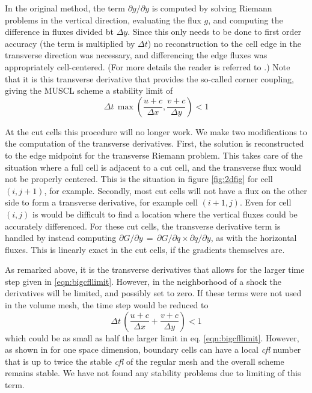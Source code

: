 In the original method, the term $\partial g / \partial y$ is computed by solving Riemann
problems in the vertical direction,  evaluating the flux $g$, and computing the
difference in fluxes divided bt $\Delta y$.
Since this only needs to be done to first order accuracy (the term is multiplied
by $\Delta t$)  no reconstruction to the cell edge  in the transverse 
direction was necessary,
and differencing the edge fluxes was appropriately cell-centered.
(For more details the reader is referred to \cite{Colella:Unsplit}.)
Note that it is this transverse derivative that provides the so-called corner coupling,
giving the MUSCL scheme a stability limit of
\begin{equation}
\label{eqn:bigcfllimit}
\Delta t \, \max \left (\frac{u+c}{\Delta x} , \frac{v+c}{\Delta y} \right) < 1
\end{equation}

At the cut cells this procedure will no longer work.   We make two modifications to the
computation of the transverse derivatives. First,
the solution is reconstructed to the edge midpoint  for the transverse Riemann problem.
This takes care of the situation where a full cell is adjacent to a cut cell, and
the transverse flux would not be properly centered. This is the situation
in figure \ref{fig:2dfig} for cell $(i,j+1)$, for example.
Secondly, most cut cells will not have a flux on the other side to form a
transverse derivative, for example cell $(i+1,j)$. Even for cell $(i,j)$ is would
be difficult to find a location where the vertical fluxes could be accurately differenced.
For these cut cells, the transverse derivative term is handled by instead computing
$ \partial G / \partial y \, = \,  \partial G / \partial q \times \partial q / \partial y$,
as with the horizontal fluxes. This is linearly exact in the cut cells, 
if the gradients themselves are.

As remarked above, it is the transverse derivatives that allows for the larger time
step given in \eqref{eqn:bigcfllimit}.
However, in the neighborhood of a shock the derivatives will be limited, and
possibly set to zero.
If these terms were not used  in the volume mesh, the time step would be reduced to 
\begin{equation}
\Delta t \, \left (\frac{u+c}{\Delta x} + \frac{v+c}{\Delta y} \right) < 1
\end{equation}
which could be as small as half the larger limit in eq. \eqref{eqn:bigcfllimit}.
However, as shown in \cite{mjb:stability2} for one space dimension, 
boundary cells can have
a local {\em cfl} number that is up to twice the stable {\em cfl} of the regular
mesh and the overall scheme remains stable.  We have not found any stability
problems due to limiting of this term.  

